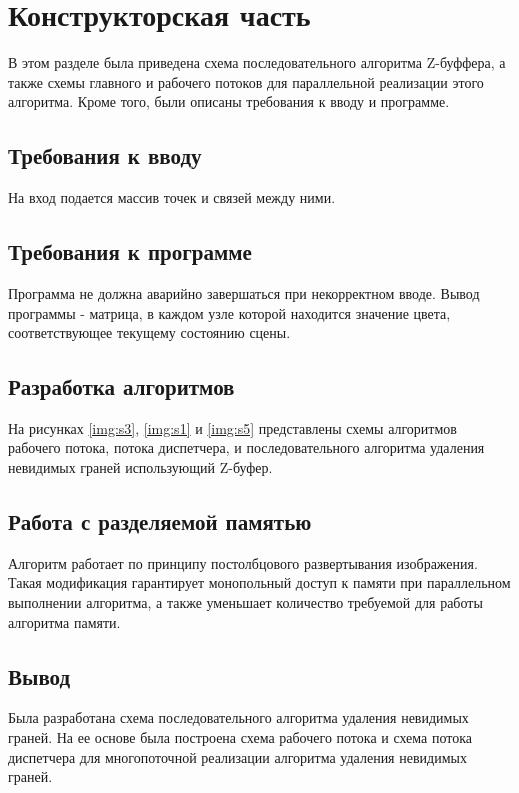 \chapter{Конструкторская часть}
 В этом разделе была приведена схема последовательного алгоритма Z-буффера, а также схемы главного и рабочего потоков для параллельной реализации этого алгоритма. Кроме того, были описаны требования к вводу и программе.

\section{Требования к вводу}
На вход подается массив точек и связей между ними. 

\section{Требования к программе}

Программа не должна аварийно завершаться при некорректном вводе. Вывод программы - матрица, в каждом узле которой находится значение цвета, соответствующее текущему состоянию сцены.

\section{Разработка алгоритмов}

На рисунках \ref{img:s3}, \ref{img:s1} и \ref{img:s5} представлены схемы алгоритмов рабочего потока, потока диспетчера, и последовательного алгоритма удаления невидимых граней использующий Z-буфер.

\section{Работа с разделяемой памятью}

Алгоритм работает по принципу постолбцового развертывания изображения. Такая модификация гарантирует монопольный доступ к памяти при параллельном выполнении алгоритма, а также уменьшает количество требуемой для работы алгоритма памяти.

\newpage
{}

\newpage
{}

\newpage
{}

\newpage
\section*{Вывод}
Была разработана схема последовательного алгоритма удаления невидимых граней. На ее основе была построена схема рабочего потока и схема потока диспетчера для многопоточной реализации алгоритма удаления невидимых граней.